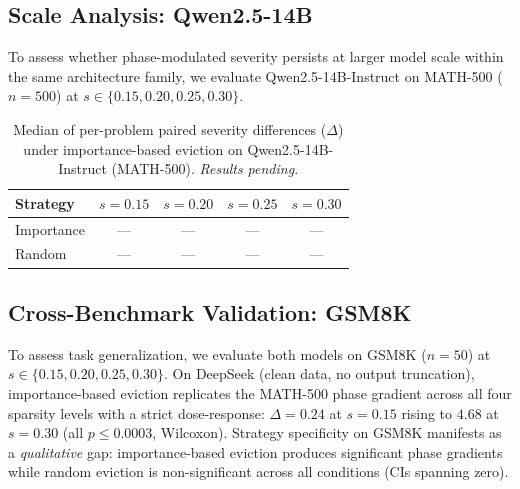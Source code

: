 \subsection{Scale Analysis: Qwen2.5-14B}
\label{sec:scale-14b}

To assess whether phase-modulated severity persists at larger model scale within the same architecture family, we evaluate Qwen2.5-14B-Instruct on MATH-500 ($n{=}500$) at $s \in \{0.15, 0.20, 0.25, 0.30\}$.

\begin{table}[t]
\centering
\small
\caption{Median of per-problem paired severity differences ($\Delta$) under importance-based eviction on Qwen2.5-14B-Instruct (MATH-500). \textit{Results pending.}}
\label{tab:scale-14b}
\begin{tabular}{@{}lcccc@{}}
\toprule
Strategy & $s{=}0.15$ & $s{=}0.20$ & $s{=}0.25$ & $s{=}0.30$ \\
\midrule
Importance & --- & --- & --- & --- \\
Random     & --- & --- & --- & --- \\
\bottomrule
\end{tabular}
\end{table}


\subsection{Cross-Benchmark Validation: GSM8K}
\label{sec:cross-benchmark}

To assess task generalization, we evaluate both models on GSM8K ($n{=}50$) at $s \in \{0.15, 0.20, 0.25, 0.30\}$. On DeepSeek (clean data, no output truncation), importance-based eviction replicates the MATH-500 phase gradient across all four sparsity levels with a strict dose-response: $\Delta{=}0.24$ at $s{=}0.15$ rising to $4.68$ at $s{=}0.30$ (all $p \leq 0.0003$, Wilcoxon). Strategy specificity on GSM8K manifests as a \emph{qualitative} gap: importance-based eviction produces significant phase gradients while random eviction is non-significant across all conditions (CIs spanning zero).

